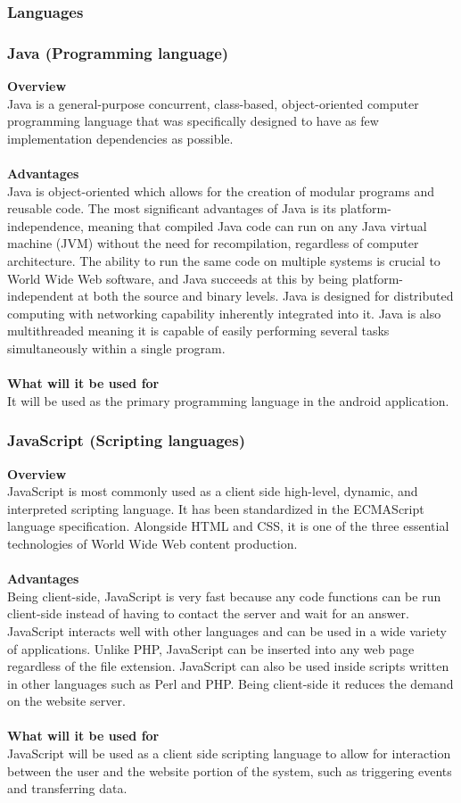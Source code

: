 \documentclass{article}
\begin{document}
\subsubsection{Languages}
\subsubsection*{Java (Programming language)}
\textbf{Overview}\\
Java is a general-purpose concurrent, class-based, object-oriented computer programming language that was specifically designed to have as few implementation dependencies as possible.\\\\
\textbf{Advantages}\\
Java is object-oriented which allows for the creation of modular programs and reusable code.
The most significant advantages of Java is its platform-independence, meaning that compiled Java code can run on any Java virtual machine (JVM) without the need for recompilation, regardless of computer architecture. The ability to run the same code on multiple systems is crucial to World Wide Web software, and Java succeeds at this by being platform-independent at both the source and binary levels. Java is designed for distributed computing with networking capability inherently integrated into it. Java is also multithreaded meaning it is capable of easily performing several tasks simultaneously within a single program.\\\\
\textbf{What will it be used for}\\
It will be used as the primary programming language in the android application.

\subsubsection*{JavaScript (Scripting languages)}
\textbf{Overview}\\
JavaScript is most commonly used as a client side high-level, dynamic, and interpreted scripting language. It has been standardized in the ECMAScript language specification. Alongside HTML and CSS, it is one of the three essential technologies of World Wide Web content production. \\\\
\textbf{Advantages}\\
Being client-side, JavaScript is very fast because any code functions can be run client-side instead of having to contact the server and wait for an answer. JavaScript interacts well with other languages and can be used in a wide variety of applications. Unlike PHP, JavaScript can be inserted into any web page regardless of the file extension. JavaScript can also be used inside scripts written in other languages such as Perl and PHP. Being client-side it reduces the demand on the website server.\\\\
\textbf{What will it be used for}\\
JavaScript will be used as a client side scripting language to allow for interaction between the user and the website portion of the system, such as triggering events and transferring data.
\end{document}
